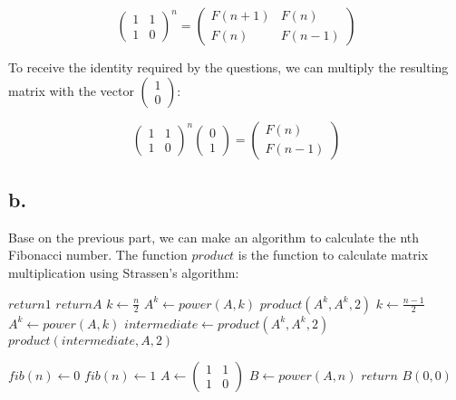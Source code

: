\documentclass{article}
\begin{document}
\[
\begin{pmatrix} 1 & 1 \\ 1 & 0 \end{pmatrix}^{n}
=
\begin{pmatrix} F(n+1) & F(n) \\ F(n)  & F(n-1) \end{pmatrix}
\]

To receive the identity required by the questions, we can multiply the resulting matrix with the vector ${\begin{pmatrix} 1 \\ 0 \end{pmatrix}}$:

\[
\begin{pmatrix} 1 & 1 \\ 1 & 0 \end{pmatrix}^{n}
\begin{pmatrix} 0 \\ 1 \end{pmatrix}
=
\begin{pmatrix} F(n) \\ F(n-1) \end{pmatrix}
\]


\pagebreak
\subsection*{b.}
Base on the previous part, we can make an algorithm to calculate the nth Fibonacci number. The function $product$ is the function to calculate matrix multiplication using Strassen's algorithm:

\begin{algorithm}
\caption{$power(A, n)$}\label{alg:cap}
\begin{algorithmic}
    \State $return 1$
    \State $return A$
\Else
        \State $k \gets \frac{n}{2}$
        \State $A^k \gets power(A, k)$ 
        \State $product(A^k, A^k, 2)$  
    \Else
        \State $k \gets \frac{n - 1}{2}$
        \State $A^k \gets power(A, k)$ 
        \State $intermediate \gets product(A^k, A^k, 2)$
        \State $product(intermediate, A, 2)$
    \EndIf
\EndIf 
\end{algorithmic}
\end{algorithm}


\begin{algorithm}
\caption{$fib(n)$}\label{alg:cap}
\begin{algorithmic}
    \State $fib(n) \gets 0$
    \State $fib(n) \gets 1$
\Else
    \State $A \gets \begin{pmatrix} 1 & 1 \\ 1 & 0 \end{pmatrix}$
    \State $B \gets power(A, n)$
    \State $return$ $B(0, 0)$
\EndIf 
\end{algorithmic}
\end{algorithm}
\end{document}
